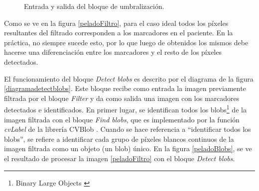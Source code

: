 \begin{figure}[ht!]
        \hspace{-1cm}
         \hspace{0.1cm}        
  \caption{Entrada y salida del bloque de umbralización.}
      \label{ejemploUmbralizacion}
\end{figure}

Como se ve en la figura \ref{peladoFiltro}, para el caso ideal todos los píxeles resultantes del filtrado corresponden a los marcadores en el paciente. En la práctica, no siempre sucede esto, por lo que luego de obtenidos los mismos debe hacerse una diferenciación entre los marcadores y el resto de los píxeles detectados.

El funcionamiento del bloque \emph{Detect blobs} es descrito por el diagrama de la figura \ref{diagramadetectblobs}. Este bloque recibe como entrada la imagen previamente filtrada por el bloque \emph{Filter} y da como salida una imagen con los marcadores detectados e identificados. En primer lugar, se identifican todos los blobs\footnote{Binary Large Objects \cite{defBlob}} de la imagen filtrada con el bloque \emph{Find blobs}, que es implementado por la función \emph{cvLabel} de la librería CVBlob \cite{cvblob}. Cuando se hace referencia a ``identificar todos los blobs'', se refiere a identificar cada grupo de píxeles blancos continuos de la imagen filtrada como un objeto (un blob) único. En la figura \ref{peladoBlobs}, se ve el resultado de procesar la imagen \ref{peladoFiltro} con el bloque \emph{Detect blobs}. 

